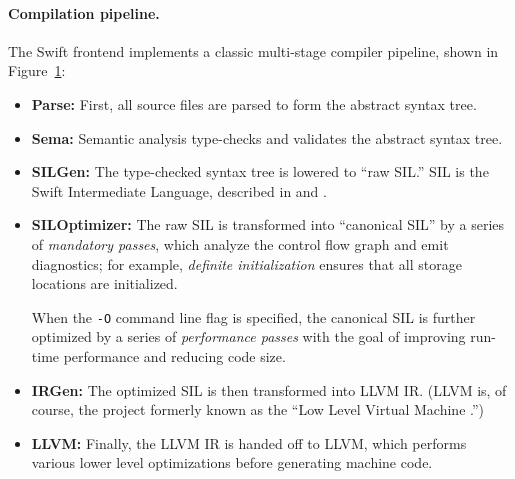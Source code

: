 \documentclass[../generics]{subfiles}
\begin{document}
\paragraph{Compilation pipeline.}
The Swift frontend implements a classic multi-stage compiler pipeline, shown in Figure~\ref{compilerpipeline}:
\begin{itemize}
\item {}\textbf{Parse:} First, all source files are parsed to form the abstract syntax tree.
\item {}\textbf{Sema:} Semantic analysis type-checks and validates the abstract syntax tree.
\item {}\textbf{SILGen:} The type-checked syntax tree is lowered to ``raw SIL.'' SIL is the Swift Intermediate Language, described in \cite{sil} and \cite{siltalk}.
\item {}\textbf{SILOptimizer:} The raw SIL is transformed into ``canonical SIL'' by a series of \emph{mandatory passes}, which analyze the control flow graph and emit diagnostics; for example, \emph{definite initialization} ensures that all storage locations are initialized.

When the \texttt{-O} command line flag is specified, the canonical SIL is further optimized by a series of \emph{performance passes} with the goal of improving run-time performance and reducing code size.
\item {}\textbf{IRGen:} The optimized SIL is then transformed into LLVM IR. (LLVM is, of course, the project formerly known as the ``Low Level Virtual Machine \cite{llvm}.'')
\item {}\textbf{LLVM:} Finally, the LLVM IR is handed off to LLVM, which performs various lower level optimizations before generating machine code.
\end{itemize}

\begin{figure}\label{compilerpipeline}
\begin{center}
\end{center}
\end{figure}
\end{document}
